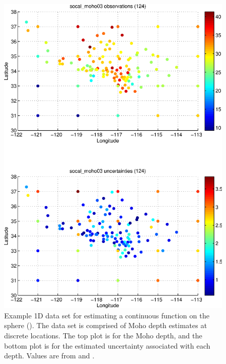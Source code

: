\documentclass[11pt,titlepage,fleqn]{article}
\begin{document}

\normalsize

\clearpage\pagebreak
\begin{figure}
\includegraphics[width=15cm]{fig1D_1.eps}
\caption[]
{{
Example 1D data set for estimating a continuous function on the sphere ().
The data set is comprised of Moho depth estimates at discrete locations.
The top plot is for the Moho depth, and the bottom plot is for the estimated uncertainty associated with each depth. Values are from \citet{YanClayton2007} and \citet{Crust2}.
\label{fig:1D_1}
}}
\end{figure}
\end{document}
